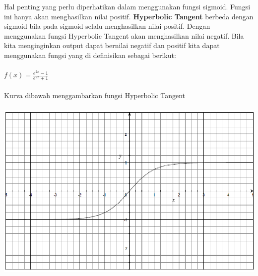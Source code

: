 \begin{itemize}
Hal penting yang perlu diperhatikan dalam menggunakan fungsi sigmoid. Fungsi ini hanya akan menghasilkan nilai positif.
\textbf{Hyperbolic Tangent}
berbeda dengan sigmoid bila pada sigmoid selalu menghasilkan nilai positif. Dengan menggunakan fungsi Hyperbolic Tangent akan menghasilkan nilai negatif. Bila kita menginginkan output dapat bernilai negatif dan positif kita dapat menggunakan fungsi yang di definisikan sebagai berikut:\\\\
$f(x)=\frac{e^{2x}-1}{e^{2x}+1}$\\\\
Kurva dibawah menggambarkan fungsi Hyperbolic Tangent\\\\
\includegraphics[width=\linewidth]{Gambar/mine/tangent}
\end{itemize}
